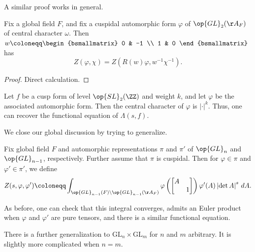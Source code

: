 \documentclass[../notes.tex]{subfiles}
\begin{document}
A similar proof works in general.
\begin{proposition}
	Fix a global field $F$, and fix a cuspidal automorphic form $\varphi$ of $\op{GL}_2(\AA_F)$ of central character $\omega$. Then $w\coloneqq\begin{bsmallmatrix}
		0 & -1 \\ 1 & 0
	\end{bsmallmatrix}$ has
	\[Z(\varphi,\chi)=Z\left(R(w)\varphi,w^{-1}\chi^{-1}\right).\]
\end{proposition}
\begin{proof}
	Direct calculation.
\end{proof}
\begin{remark}
	Let $f$ be a cusp form of level $\op{SL}_2(\ZZ)$ and weight $k$, and let $\varphi$ be the associated automorphic form. Then the central character of $\varphi$ is $\left|\cdot\right|^{k}$. Thus, one can recover the functional equation of $\Lambda(s,f)$.
\end{remark}
We close our global discussion by trying to generalize.
\begin{definition}
	Fix global field $F$ and automorphic representations $\pi$ and $\pi'$ of $\op{GL}_n$ and $\op{GL}_{n-1}$, respectively. Further assume that $\pi$ is cuspidal. Then for $\varphi\in\pi$ and $\varphi'\in\pi'$, we define
	\[Z(s,\varphi,\varphi')\coloneqq\int_{\op{GL}_{n-1}(F)\backslash\op{GL}_{n-1}(\AA_F)}\varphi\left(\begin{bmatrix}
		A \\ & 1
	\end{bmatrix}\right)\varphi'(A)\left|\det A\right|^s\,dA.\]
\end{definition}
\begin{remark}
	As before, one can check that this integral converges, admits an Euler product when $\varphi$ and $\varphi'$ are pure tensors, and there is a similar functional equation.
\end{remark}
\begin{remark}
	There is a further generalization to $\mathrm{GL}_n\times\mathrm{GL}_m$ for $n$ and $m$ arbitrary. It is slightly more complicated when $n=m$.
\end{remark}
\end{document}

